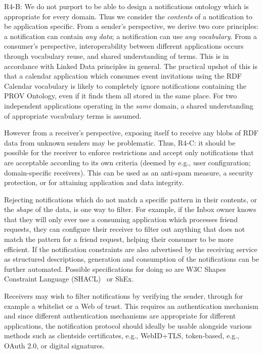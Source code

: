 \documentclass[a4paper]{llncs}
\begin{document}
\par R4-B: We do not purport to be able to design a notifications ontology which is appropriate for every domain. Thus we consider the {\em contents} of a notification to be application specific. From a sender’s perspective, we derive two core principles: a notification can contain {\em any data}; a notification can use {\em any vocabulary}. From a consumer’s perspective, interoperability between different applications occurs through vocabulary reuse, and shared understanding of terms. This is in accordance with Linked Data principles in general. The practical upshot of this is that a calendar application which consumes event invitations using the \empty RDF Calendar vocabulary is likely to completely ignore notifications containing the \empty PROV Ontology, even if it finds them all stored in the same place. For two independent applications operating in the {\em same} domain, a shared understanding of appropriate vocabulary terms is assumed.



\par However from a receiver’s perspective, exposing itself to receive any blobs of RDF data from unknown senders may be problematic. Thus, R4-C: it should be possible for the receiver to enforce restrictions and accept only notifications that are acceptable according to its own criteria (deemed by e.g., user configuration; domain-specific receivers). This can be used as an anti-spam measure, a security protection, or for attaining application and data integrity.


\par Rejecting notifications which do not match a specific pattern in their contents, or the {\em shape} of the data, is one way to filter. For example, if the Inbox owner knows that they will only ever use a consuming application which processes friend requests, they can configure their receiver to filter out anything that does not match the pattern for a friend request, helping their consumer to be more efficient. If the notification constraints are also advertised by the receiving service as structured descriptions, generation and consumption of the notifications can be further automated. Possible specifications for doing so are W3C \empty Shapes Constraint Language (SHACL)~\cite{ref-15} or \empty ShEx.


\par Receivers may wish to filter notifications by verifying the sender, through for example a whitelist or a Web of trust. This requires an authentication mechanism and since different authentication mechanisms are appropriate for different applications, the notification protocol should ideally be usable alongside various methods such as clientside certificates, e.g., WebID+TLS, token-based, e.g., OAuth 2.0, or digital signatures.
\end{document}
